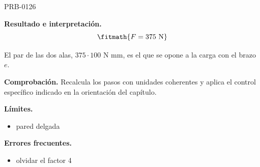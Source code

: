 \begin{studiumworked}{PRB-0126}
\begin{enumerate}
\end{enumerate}

\textbf{Resultado e interpretación.}\[\fitmath{F = 375\ \mathrm{N}}\]

El par de las dos alas, $375\cdot 100$ N mm, es el que se opone a la carga con el brazo $e$.

\par\textbf{Comprobación.} Recalcula los pasos con unidades coherentes y aplica el control específico indicado en la orientación del capítulo.

\textbf{Límites.}\begin{itemize}\item pared delgada\end{itemize}

\textbf{Errores frecuentes.}\begin{itemize}\item olvidar el factor 4\end{itemize}

\end{studiumworked}

\Needspace{.3\textheight}

